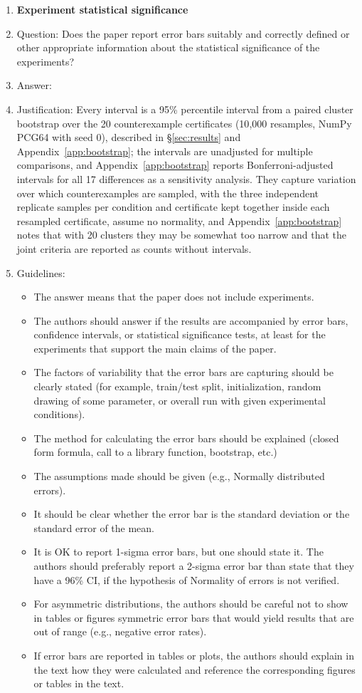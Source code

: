 \begin{enumerate}
\item {\bf Experiment statistical significance}
    \item[] Question: Does the paper report error bars suitably and correctly defined or other appropriate information about the statistical significance of the experiments?
    \item[] Answer: \answerYes{}
    \item[] Justification: Every interval is a 95\% percentile interval from a paired cluster bootstrap over the 20 counterexample certificates (10{,}000 resamples, NumPy PCG64 with seed 0), described in \S\ref{sec:results} and Appendix~\ref{app:bootstrap}; the intervals are unadjusted for multiple comparisons, and Appendix~\ref{app:bootstrap} reports Bonferroni-adjusted intervals for all 17 differences as a sensitivity analysis. They capture variation over which counterexamples are sampled, with the three independent replicate samples per condition and certificate kept together inside each resampled certificate, assume no normality, and Appendix~\ref{app:bootstrap} notes that with 20 clusters they may be somewhat too narrow and that the joint criteria are reported as counts without intervals.
    \item[] Guidelines:
    \begin{itemize}
        \item The answer \answerNA{} means that the paper does not include experiments.
        \item The authors should answer \answerYes{} if the results are accompanied by error bars, confidence intervals, or statistical significance tests, at least for the experiments that support the main claims of the paper.
        \item The factors of variability that the error bars are capturing should be clearly stated (for example, train/test split, initialization, random drawing of some parameter, or overall run with given experimental conditions).
        \item The method for calculating the error bars should be explained (closed form formula, call to a library function, bootstrap, etc.)
        \item The assumptions made should be given (e.g., Normally distributed errors).
        \item It should be clear whether the error bar is the standard deviation or the standard error of the mean.
        \item It is OK to report 1-sigma error bars, but one should state it. The authors should preferably report a 2-sigma error bar than state that they have a 96\% CI, if the hypothesis of Normality of errors is not verified.
        \item For asymmetric distributions, the authors should be careful not to show in tables or figures symmetric error bars that would yield results that are out of range (e.g., negative error rates).
        \item If error bars are reported in tables or plots, the authors should explain in the text how they were calculated and reference the corresponding figures or tables in the text.
    \end{itemize}


\end{enumerate}
